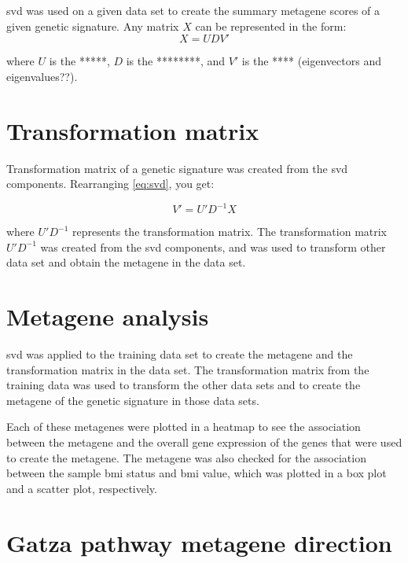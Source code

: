 \gls{svd} was used on a given data set to create the summary metagene scores of a given genetic signature.
Any matrix $X$ can be represented in the form:
\begin{equation}
	\label{eq:svd}
	X = UDV'
\end{equation}

\noindent
where $U$ is the *****, $D$ is the ********, and $V'$ is the **** (eigenvectors and eigenvalues??).

\section{Transformation matrix}
\label{sec:transformation_matrix}

Transformation matrix of a genetic signature was created from the \gls{svd} components.
Rearranging \cref{eq:svd}, you get:

\begin{equation}
	\label{eq:transmat}
	V' = U'D^{-1}X
\end{equation}

\noindent
where $U'D^{-1}$ represents the transformation matrix.
The transformation matrix $U'D^{-1}$ was created from the \gls{svd} components, and was used to transform other data set and obtain the metagene in the data set.

\section{Metagene analysis}
\label{sec:metagene_analysis}

\gls{svd} was applied to the training data set to create the metagene and the transformation matrix in the data set.
The transformation matrix from the training data was used to transform the other data sets and to create the metagene of the genetic signature in those data sets.

Each of these metagenes were plotted in a heatmap to see the association between the metagene and the overall gene expression of the genes that were used to create the metagene.
The metagene was also checked for the association between the sample \gls{bmi} status and \gls{bmi} value, which was plotted in a box plot and a scatter plot, respectively.

\section{Gatza pathway metagene direction}
\label{sec:pathway_metagene_direction}

